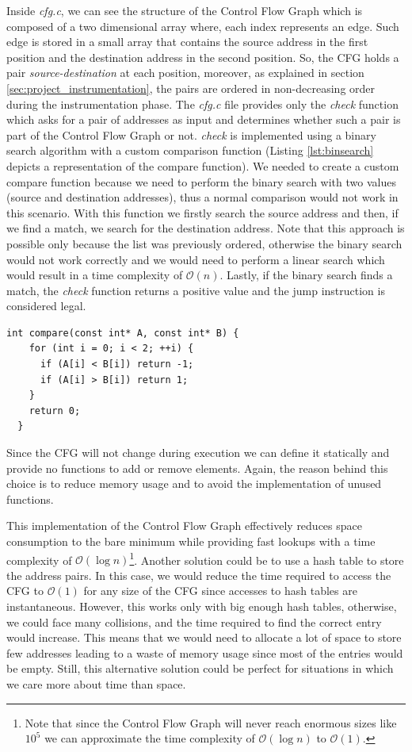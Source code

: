 Inside \textit{cfg.c}, we can see the structure of the Control Flow Graph which
is composed of a two dimensional array where, each index represents an edge.
Such edge is stored in a small array that contains the source address in the
first position and the destination address in the second position. So, the CFG
holds a pair \textit{source-destination} at each position, moreover, as explained
in section \ref{sec:project_instrumentation}, the pairs are ordered in non-decreasing
order during the instrumentation phase. The \textit{cfg.c} file provides only
the \textit{check} function which asks for a pair of addresses as input and determines
whether such a pair is part of the Control Flow Graph or not. \textit{check} is implemented
using a binary search algorithm with a custom comparison function (Listing
\ref{lst:binsearch} depicts a representation of the compare function). We needed
to create a custom compare function because we need to perform the binary search
with two values (source and destination addresses), thus a normal comparison would
not work in this scenario. With this function we firstly search the source
address and then, if we find a match, we search for the destination address. Note
that this approach is possible only because the list was previously ordered,
otherwise the binary search would not work correctly and we would need to
perform a linear search which would result in a time complexity of
$\mathcal{O}(n)$. Lastly, if the binary search finds a match, the \textit{check}
function returns a positive value and the jump instruction is considered legal. \\
\begin{lstlisting}[style=CStyle, caption= Comparison for binary search, label={lst:binsearch}]
  int compare(const int* A, const int* B) {
    for (int i = 0; i < 2; ++i) {
      if (A[i] < B[i]) return -1;
      if (A[i] > B[i]) return 1;
    }
    return 0;
  }
\end{lstlisting}

Since the CFG will not change during execution we can define it statically and
provide no functions to add or remove elements. Again, the reason behind this
choice is to reduce memory usage and to avoid the implementation of unused
functions.

This implementation of the Control Flow Graph effectively reduces space
consumption to the bare minimum while providing fast lookups with a time
complexity of $\mathcal{O}(\log{n})$\footnote{Note that since the Control Flow
Graph will never reach enormous sizes like $10^{5}$ we can approximate the time
complexity of $\mathcal{O}(\log{n})$ to $\mathcal{O}(1)$.}. Another solution
could be to use a hash table to store the address pairs. In this case, we would
reduce the time required to access the CFG to $\mathcal{O}(1)$ for any size of
the CFG since accesses to hash tables are instantaneous. However, this works
only with big enough hash tables, otherwise, we could face many collisions, and the
time required to find the correct entry would increase. This means that we would
need to allocate a lot of space to store few addresses leading to a waste of
memory usage since most of the entries would be empty. Still, this alternative
solution could be perfect for situations in which we care more about time than
space.

